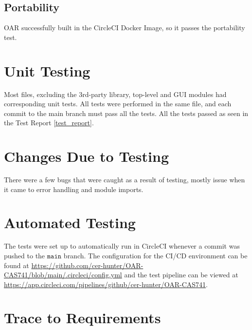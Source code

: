 \documentclass[12pt, titlepage]{article}
\begin{document}
\subsection{Portability}

OAR successfully built in the CircleCI Docker Image, so it passes the portability test.

\section{Unit Testing}

Most files, excluding the 3rd-party library, top-level and GUI modules had corresponding unit tests.
All tests were performed in the same file, and each commit to the main branch must pass all the tests.
All the tests passed as seen in the Test Report \ref{test_report}.

\section{Changes Due to Testing}

There were a few bugs that were caught as a result of testing, mostly issue when it came to error handling
and module imports.

\section{Automated Testing}

The tests were set up to automatically run in CircleCI whenever a commit was pushed to the $\mathtt{main}$ branch.
The configuration for the CI/CD environment can be found at \url{https://github.com/cer-hunter/OAR-CAS741/blob/main/.circleci/config.yml}
and the test pipeline can be viewed at \url{https://app.circleci.com/pipelines/github/cer-hunter/OAR-CAS741}.
		
\section{Trace to Requirements}
\end{document}
